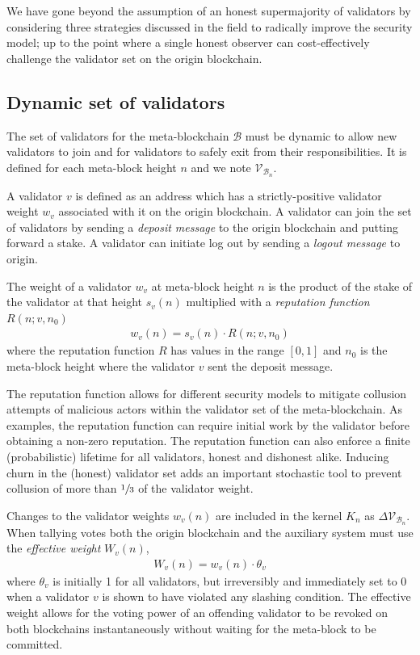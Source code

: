 \documentclass[12pt,a4paper]{article}
\begin{document}
We have gone beyond the assumption of an honest supermajority of validators by considering three strategies discussed in the field to radically improve the security model; up to the point where a single honest observer can cost-effectively challenge the validator set on the origin blockchain.

\subsection{Dynamic set of validators}

The set of validators for the meta-blockchain $\mathcal{B}$ must be dynamic to allow new validators to join and for validators to safely exit from their responsibilities.
It is defined for each meta-block height $n$ and we note $\mathcal{V}_{\mathcal{B}_n}$.

A validator $v$ is defined as an address which has a strictly-positive validator weight $w_v$ associated with it on the origin blockchain.
A validator can join the set of validators by sending a \emph{deposit message} to the origin blockchain and putting forward a stake.
A validator can initiate log out by sending a \emph{logout message} to origin.

The weight of a validator $w_v$ at meta-block height $n$ is the product of the stake of the validator at that height $s_v(n)$ multiplied with a \emph{reputation function} $R(n; v, n_0)$
\begin{align}
\label{validator_weights}
  w_v(n) = s_v(n) \cdot R(n; v, n_0)
\end{align}
where the reputation function $R$ has values in the range $[0,1]$ and $n_0$ is the meta-block height where the validator $v$ sent the deposit message.

The reputation function allows for different security models to mitigate collusion attempts of malicious actors within the validator set of the meta-blockchain.
As examples, the reputation function can require initial work by the validator before obtaining a non-zero reputation.
The reputation function can also enforce a finite (probabilistic) lifetime for all validators, honest and dishonest alike.
Inducing churn in the (honest) validator set adds an important stochastic tool to prevent collusion of more than $\sfrac{1}{3}$ of the validator weight.

Changes to the validator weights $w_v(n)$ are included in the kernel $K_n$ as $\Delta\mathcal{V}_{\mathcal{B}_n}$.  When tallying votes both the origin blockchain and the auxiliary system must use the \emph{effective weight} $W_v(n)$,
\begin{align*}
  W_v(n) = w_v(n) \cdot \theta_v
\end{align*}
where $\theta_v$ is initially 1 for all validators, but irreversibly and immediately set to 0 when a validator $v$ is shown to have violated any slashing condition.
The effective weight allows for the voting power of an offending validator to be revoked on both blockchains instantaneously without waiting for the meta-block to be committed.
\end{document}
